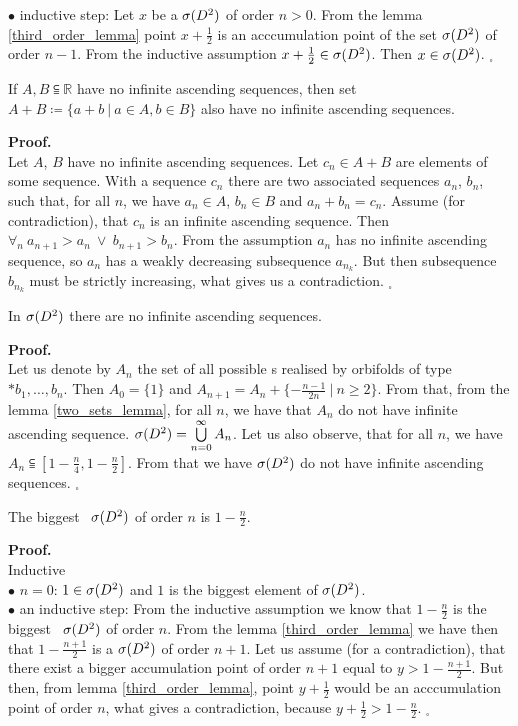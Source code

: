 $\bullet$ inductive step: Let $x$ be a \apots  ${\mathcal{\sigma}(D^2)}$ of order $n>0$. From the lemma 
\ref{third_order_lemma} point $x+\frac{1}{2}$ is an acccumulation point of the set ${\mathcal{\sigma}(D^2)}$  
of order $n-1$. From the inductive assumption $x+\frac{1}{2} \in {\mathcal{\sigma}(D^2)}$. Then $x \in {\mathcal{\sigma}(D^2)}$. 
$_\square$ 
\begin{lemma}\label{two_sets_lemma}
If $A, B \subseteqq \mathbb{R}$ have no infinite ascending sequences, then set 
$A + B \coloneqq \{a+b\ |\ a \in A, b \in B\}$ also have no infinite ascending sequences. 
\end{lemma}
\noindent\textbf{Proof.} \\
Let $A$, $B$ have no infinite ascending sequences. 
Let $c_n \in A + B$ are elements of some sequence. With a sequence $c_n$ there are 
two associated sequences $a_n$, $b_n$, such that, for all $n$, we have $a_n \in A$, $b_n \in B$ and 
$a_n + b_n = c_n$. Assume (for contradiction), that $c_n$ is an infinite ascending sequence. 
Then $\forall_n\ a_{n+1}>a_n\ \lor\ b_{n+1} > b_n$. From the assumption $a_n$ has no infinite 
ascending sequence, so $a_n$ has a weakly decreasing subsequence $a_{n_k}$. But then 
subsequence $b_{n_k}$ must be strictly increasing, what gives 
us a contradiction. \Lightning $_\square$ 
\begin{lemma}\label{well_order}
In ${\mathcal{\sigma}(D^2)}$ there are no infinite ascending sequences.
\end{lemma}
\noindent\textbf{Proof.} \\
Let us denote by $A_n$ the set of all possible \Eoc s realised by orbifolds of type 
$*b_1,\dots,b_n$. Then $A_0 = \{1\}$ and $A_{n+1}=A_n+\{-\frac{n-1}{2n}\ |\ n\geq 2\}$. 
From that, from the lemma \ref{two_sets_lemma}, for all $n$, we have that $A_n$ do not have 
infinite ascending sequence. ${\mathcal{\sigma}(D^2)} = \bigcup\limits^\infty_{n=0}A_n$. Let us also observe, that 
for all $n$, we have $A_n \subseteqq [1-\frac{n}{4},1-\frac{n}{2}]$. From that we have ${\mathcal{\sigma}(D^2)}$ 
do not have infinite ascending sequences. $_\square$
\begin{theorem}\label{biggest \apots}
The biggest \apots\ ${\mathcal{\sigma}(D^2)}$ of order $n$ is $1-\frac{n}{2}$.
\end{theorem}
\noindent\textbf{Proof.}\\
Inductive \\
$\bullet$ $n=0$: $1\in {\mathcal{\sigma}(D^2)}$ and $1$ is the biggest element of ${\mathcal{\sigma}(D^2)}$. \\
$\bullet$ an inductive step: From the inductive assumption we know that $1-\frac{n}{2}$ is 
the biggest \apots\  ${\mathcal{\sigma}(D^2)}$ of order $n$. From the lemma \ref{third_order_lemma} we have then 
that $1-\frac{n+1}{2}$ is a \apots  ${\mathcal{\sigma}(D^2)}$ of order $n+1$. Let us assume (for a contradiction), 
that there exist a bigger accumulation point of order $n+1$ equal to $y > 1-\frac{n+1}{2}$. 
But then, from lemma \ref{third_order_lemma}, point $y+\frac{1}{2}$ would be an acccumulation 
point 
of order $n$, what gives a contradiction, because $y+\frac{1}{2}>1-\frac{n}{2}$. $_\square$ 

